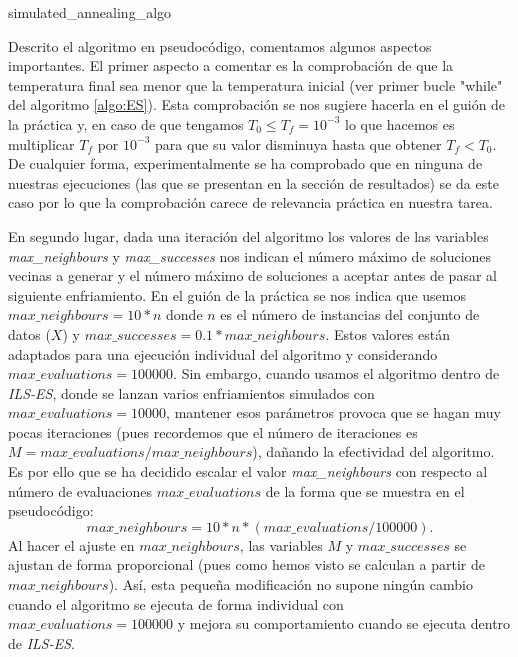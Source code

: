 \documentclass[11pt,a4paper]{article}
\begin{document}
	\begin{algorithm}
	 	\caption{simulated\_annealing\_algo}
	\end{algorithm}
	
	Descrito el algoritmo en pseudocódigo, comentamos algunos aspectos importantes. El primer aspecto a comentar es la comprobación de que la temperatura final sea menor que la temperatura inicial (ver primer bucle "while" del algoritmo  \ref{algo:ES}). Esta comprobación se nos sugiere hacerla en el guión de la práctica y, en caso de que tengamos $T_0 \leq T_f = 10^{-3}$ lo que hacemos es multiplicar $T_f$ por $10^{-3}$ para que su valor disminuya hasta que obtener $T_f < T_0$. De cualquier forma, experimentalmente se ha comprobado que en ninguna de nuestras ejecuciones (las que se presentan en la sección de resultados) se da este caso por lo que la comprobación carece de relevancia práctica en nuestra tarea. 
	
	En segundo lugar, dada una iteración del algoritmo los valores de las variables \textit{max\_neighbours} y \textit{max\_successes} nos indican el número máximo de soluciones vecinas a generar y el número máximo de soluciones a aceptar antes de pasar al siguiente enfriamiento. En el guión de la práctica se nos indica que usemos $max\_neighbours = 10*n$ donde $n$ es el número de instancias del conjunto de datos ($X$) y $max\_successes = 0.1 * max\_neighbours$. Estos valores están adaptados para una ejecución individual del algoritmo y considerando $max\_evaluations=100000$. Sin embargo, cuando usamos el algoritmo dentro de \textit{ILS-ES}, donde se lanzan varios enfriamientos simulados con $max\_evaluations=10000$, mantener esos parámetros provoca que se hagan muy pocas iteraciones (pues recordemos que el número de iteraciones es $M= max\_evaluations / max\_neighbours$), dañando la efectividad del algoritmo. Es por ello que se ha decidido escalar el valor \textit{max\_neighbours} con respecto al número de evaluaciones $max\_evaluations$ de la forma que se muestra en el pseudocódigo: $$max\_neighbours = 10*n*(max\_evaluations/100000).$$
	Al hacer el ajuste en $max\_neighbours$, las variables $M$ y $max\_successes$ se ajustan de forma proporcional (pues como hemos visto se calculan a partir de $max\_neighbours$). Así, esta pequeña modificación no supone ningún cambio cuando el algoritmo se ejecuta de forma individual con $max\_evaluations=100000$ y mejora su comportamiento cuando se ejecuta dentro de \textit{ILS-ES}.
	
\end{document}

